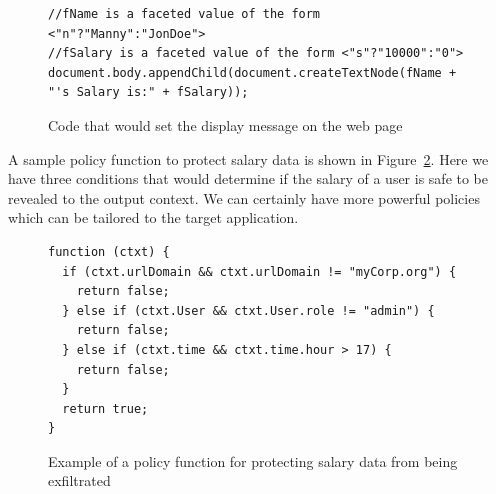 \begin{figure}
  \begin{lstlisting}
//fName is a faceted value of the form <"n"?"Manny":"JonDoe">
//fSalary is a faceted value of the form <"s"?"10000":"0">
document.body.appendChild(document.createTextNode(fName + "'s Salary is:" + fSalary));
  \end{lstlisting}
  \caption{Code that would set the display message on the web page}
  \label{fig:displaySalary}
\end{figure}

A sample policy function to protect salary data is shown in Figure~\ref{fig:policyEx}.
Here we have three conditions that would determine if the salary of a user is safe
to be revealed to the output context. We can certainly have more powerful policies
which can be tailored to the target application.

\begin{figure}[H]
  \begin{lstlisting}
function (ctxt) {
  if (ctxt.urlDomain && ctxt.urlDomain != "myCorp.org") {
    return false;
  } else if (ctxt.User && ctxt.User.role != "admin") {
    return false;
  } else if (ctxt.time && ctxt.time.hour > 17) {
    return false;
  }
  return true;
}
  \end{lstlisting}
  \caption{Example of a policy function for protecting salary data from being exfiltrated}
  \label{fig:policyEx}
\end{figure}
